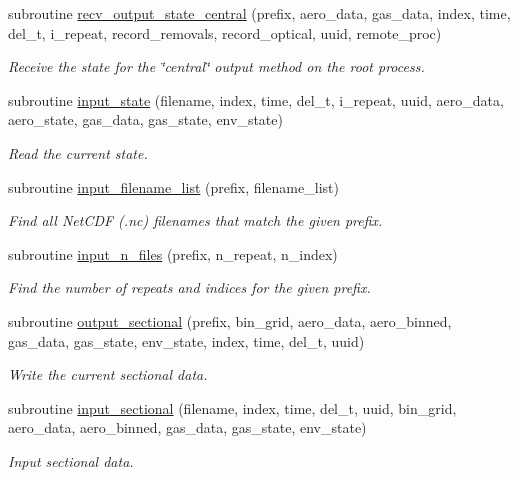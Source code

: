\begin{DoxyCompactItemize}
subroutine \mbox{\hyperlink{namespacepmc__output_a500e8f765493908b09510fcf8b497e3e}{recv\+\_\+output\+\_\+state\+\_\+central}} (prefix, aero\+\_\+data, gas\+\_\+data, index, time, del\+\_\+t, i\+\_\+repeat, record\+\_\+removals, record\+\_\+optical, uuid, remote\+\_\+proc)
\begin{DoxyCompactList}\small\item\em Receive the state for the \char`\"{}central\char`\"{} output method on the root process. \end{DoxyCompactList}\item 
subroutine \mbox{\hyperlink{namespacepmc__output_a2ff47cdec429fe8017c81142579dbf01}{input\+\_\+state}} (filename, index, time, del\+\_\+t, i\+\_\+repeat, uuid, aero\+\_\+data, aero\+\_\+state, gas\+\_\+data, gas\+\_\+state, env\+\_\+state)
\begin{DoxyCompactList}\small\item\em Read the current state. \end{DoxyCompactList}\item 
subroutine \mbox{\hyperlink{namespacepmc__output_ae4a4e34f6d1c462b463d453659adc2c6}{input\+\_\+filename\+\_\+list}} (prefix, filename\+\_\+list)
\begin{DoxyCompactList}\small\item\em Find all Net\+C\+DF (.nc) filenames that match the given prefix. \end{DoxyCompactList}\item 
subroutine \mbox{\hyperlink{namespacepmc__output_ac7e633e29c4be7b105c968977e1ea3eb}{input\+\_\+n\+\_\+files}} (prefix, n\+\_\+repeat, n\+\_\+index)
\begin{DoxyCompactList}\small\item\em Find the number of repeats and indices for the given prefix. \end{DoxyCompactList}\item 
subroutine \mbox{\hyperlink{namespacepmc__output_aaeb4ae95909c840a46222d7a1183014c}{output\+\_\+sectional}} (prefix, bin\+\_\+grid, aero\+\_\+data, aero\+\_\+binned, gas\+\_\+data, gas\+\_\+state, env\+\_\+state, index, time, del\+\_\+t, uuid)
\begin{DoxyCompactList}\small\item\em Write the current sectional data. \end{DoxyCompactList}\item 
subroutine \mbox{\hyperlink{namespacepmc__output_aa408179ae00883a023ad1087057b01ef}{input\+\_\+sectional}} (filename, index, time, del\+\_\+t, uuid, bin\+\_\+grid, aero\+\_\+data, aero\+\_\+binned, gas\+\_\+data, gas\+\_\+state, env\+\_\+state)
\begin{DoxyCompactList}\small\item\em Input sectional data. \end{DoxyCompactList}\end{DoxyCompactItemize}

